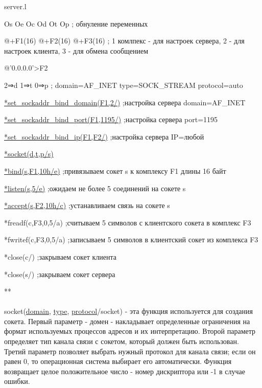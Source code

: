 \documentclass[12t]{article}
\begin{document}
\textcolor[rgb]{1,0,0}{server.l}

Os Oe Oc Od Ot Op ; обнуление переменных

@+F1(16) @+F2(16) @+F3(16) ; 1 комлпекс - для настроек сервера, 2 - для настроек клиента, 3 - для обмена сообщением

@'0.0.0.0'>F2

2⇒d 1⇒t 0⇒p ; domain=AF\_INET type=SOCK\_STREAM protocol=auto

\hyperref [set_sockaddr_bind_domain] {*set\_sockaddr\_bind\_domain(F1,2/)} ;настройка сервера domain=AF\_INET 

\hyperref [set_sockaddr_bind_port] {*set\_sockaddr\_bind\_port(F1,1195/)} ;настройка сервера port=1195

\hyperref [set_sockaddr_bind_ip] {*set\_sockaddr\_bind\_ip(F1,F2/)} ;настройка сервера IP=любой

\hyperref [socket] {*socket(d,t,p/s)}

\hyperref [bind] {*bind(s,F1,10h/e)} ;привязываем сокет s к комплексу F1 длины 16 байт

\hyperref [listen] {*listen(s,5/e)} ;ожидаем не более 5 соединений на сокете s

\hyperref [accept] {*accept(s,F2,10h/c)} ;устанавливаем связь на сокете s

*freadf(c,F3,0,5/a) ;считываем 5 символов с клиентского сокета в комплекс F3

*fwritef(c,F3,0,5/a) ;записываем 5 символов в клиентский сокет из комплекса F3

*close(c/) ;закрываем сокет клиента

*close(s/) ;закрываем сокет сервера

**
~\\
~\\
\label{socket}
socket(\hyperref[domain]{domain}, \hyperref[type]{type}, \hyperref[protocol]{protocol}/socket) - эта функция используется для создания сокета. Первый параметр - домен - накладывает определенные ограничения на формат используемых процессов адресов и их интерпретацию. Второй параметр определяет тип канала связи с сокетом, который должен быть использован. Третий параметр позволяет выбрать нужный протокол для канала связи; если он равен 0, то операционная система выбирает его автоматически. Функция возвращает целое положительное число - номер дискриптора или -1 в случае ошибки.
\end{document}
